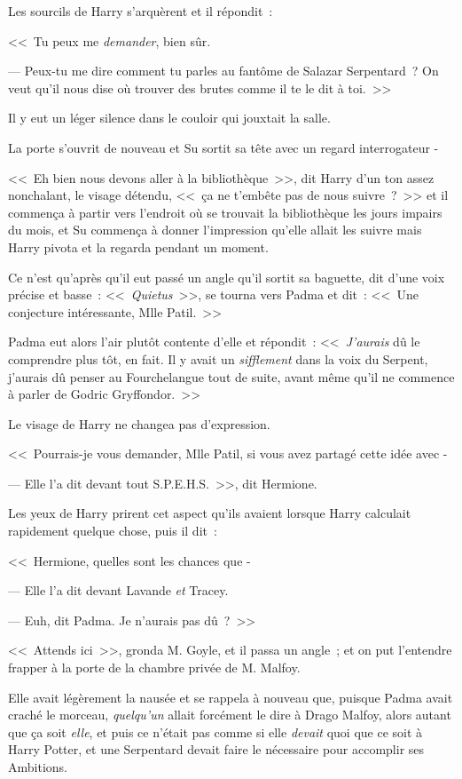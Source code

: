Les sourcils de Harry s'arquèrent et il répondit~:

<<~Tu peux me \emph{demander}, bien sûr.

--- Peux-tu me dire comment tu parles au fantôme de Salazar Serpentard~? On veut qu'il nous dise où trouver des brutes comme il te le dit à toi.~>>

Il y eut un léger silence dans le couloir qui jouxtait la salle.

La porte s'ouvrit de nouveau et Su sortit sa tête avec un regard interrogateur -

<<~Eh bien nous devons aller à la bibliothèque~>>, dit Harry d'un ton assez nonchalant, le visage détendu, <<~ça ne t'embête pas de nous suivre~?~>> et il commença à partir vers l'endroit où se trouvait la bibliothèque les jours impairs du mois, et Su commença à donner l'impression qu'elle allait les suivre mais Harry pivota et la regarda pendant un moment.

Ce n'est qu'après qu'il eut passé un angle qu'il sortit sa baguette, dit d'une voix précise et basse~: <<~\emph{Quietus}~>>, se tourna vers Padma et dit~: <<~Une conjecture intéressante, Mlle Patil.~>>

Padma eut alors l'air plutôt contente d'elle et répondit~: <<~\emph{J'aurais} dû le comprendre plus tôt, en fait. Il y avait un \emph{sifflement} dans la voix du Serpent, j'aurais dû penser au Fourchelangue tout de suite, avant même qu'il ne commence à parler de Godric Gryffondor.~>>

Le visage de Harry ne changea pas d'expression.

<<~Pourrais-je vous demander, Mlle Patil, si vous avez partagé cette idée avec -

--- Elle l'a dit devant tout S.P.E.H.S.~>>, dit Hermione.

Les yeux de Harry prirent cet aspect qu'ils avaient lorsque Harry calculait rapidement quelque chose, puis il dit~:

<<~Hermione, quelles sont les chances que -

--- Elle l'a dit devant Lavande \emph{et} Tracey.

--- Euh, dit Padma. Je n'aurais pas dû~?~>>

\later

<<~Attends ici~>>, gronda M. Goyle, et il passa un angle~; et on put l'entendre frapper à la porte de la chambre privée de M. Malfoy.

Elle avait légèrement la nausée et se rappela à nouveau que, puisque Padma avait craché le morceau, \emph{quelqu'un} allait forcément le dire à Drago Malfoy, alors autant que ça soit \emph{elle}, et puis ce n'était pas comme si elle \emph{devait} quoi que ce soit à Harry Potter, et une Serpentard devait faire le nécessaire pour accomplir ses Ambitions.

